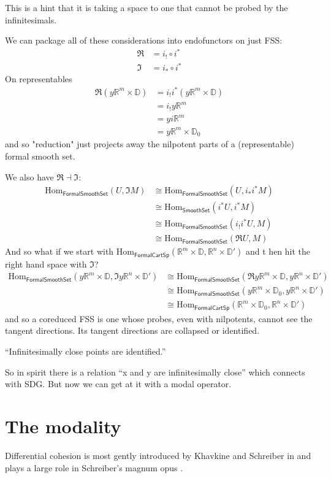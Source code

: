 \documentclass[12pt]{article}
\newcommand{\Hom}{\mathrm{Hom}}
\newcommand{\adj}{\dashv}
\newcommand{\rrn}{\ensuremath{\mathbb{R}^n}}
\newcommand{\rrm}{\ensuremath{\mathbb{R}^m}}
\newcommand{\dd}{\ensuremath{\mathbb{D}}}
\newcommand{\formalcart}{\textsf{FormalCartSp}}
\newcommand{\formalsmoothset}{\textsf{FormalSmoothSet}}
\newcommand{\smoothset}{\textsf{SmoothSet}}
\newcommand{\rmodal}{\Re}
\newcommand{\imodal}{\Im}
\begin{document}
This is a hint that it is taking a space to one that cannot be probed by the infinitesimals.

We can package all of these considerations into endofunctors on just FSS:
\begin{align*}
\rmodal &= i_!\circ i^* \\
\imodal &= i_*\circ i^*
\end{align*}
On representables
\begin{align*}
\rmodal(y\rrm\times\dd) &= i_!i^*(y\rrm\times\dd) \\
&= i_!y\rrm \\
&= yi\rrm \\
&= y\rrm\times\dd_0
\end{align*}
and so "reduction" just projects away the nilpotent parts of a (representable) formal smooth set.

We also have $\rmodal\adj\imodal$:
\begin{align*}
\Hom_{\formalsmoothset}(U, \imodal M)&\cong\Hom_{\formalsmoothset}(U,i_* i^*M) \\
&\cong \Hom_{\smoothset}(i^*U, i^*M) \\
&\cong \Hom_{\formalsmoothset}(i_!i^*U, M) \\
&\cong \Hom_{\formalsmoothset}(\rmodal U, M)
\end{align*}
And so what if we start with $\Hom_{\formalcart}(\rrm\times\dd, \rrn\times\dd')$ and t hen hit the right hand space with $\imodal$?
\begin{align*}
\Hom_{\formalsmoothset}(y\rrm\times\dd, \imodal y\rrn\times\dd') &\cong \Hom_{\formalsmoothset}(\rmodal y\rrm\times\dd, y\rrn\times\dd') \\
&\cong \Hom_{\formalsmoothset}(y\rrm\times\dd_0, y\rrn\times\dd') \\
&\cong \Hom_{\formalcart}(\rrm\times\dd_0, \rrn\times\dd')
\end{align*}
and so a coreduced FSS is one whose probes, even with nilpotents, cannot see the tangent directions. Its tangent directions are collapsed or identified.

“Infinitesimally close points are identified.”

So in spirit there is a relation “x and y are infinitesimally close” which connects with SDG. But now we can get at it with a modal operator.



\section{The modality}\label{sec:modality}
Differential cohesion is most gently introduced by Khavkine and Schreiber in \cite{khavkine_synthetic_2017} and plays a large role in Schreiber's magnum opus \cite{schreiber_differential_2013}.




\end{document}
